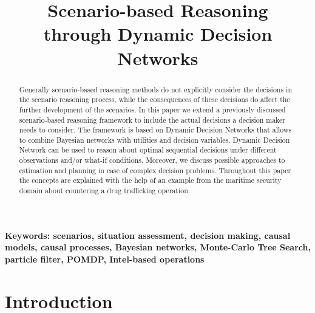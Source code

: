 \documentclass[conference]{IEEEtran}
\begin{document}
\title{Scenario-based Reasoning \\through Dynamic Decision Networks}

\author{
\and
{}
\and
{}
}


\maketitle

\begin{abstract}
Generally scenario-based reasoning methods do not explicitly consider the decisions in the scenario reasoning process, while the consequences of these decisions do affect the further development of the scenarios. In this paper we extend a previously discussed scenario-based reasoning framework to include the actual decisions a decision maker needs to consider. The framework is based on Dynamic Decision Networks that allows to combine Bayesian networks with utilities and decision variables. Dynamic Decision Network can be used to reason about optimal sequential decisions under different observations and/or what-if conditions. Moreover, we discuss possible approaches to estimation and planning in case of complex decision problems. Throughout this paper the concepts are explained with the help of an example from the maritime security domain about countering a drug trafficking operation.
\end{abstract}

\noindent
{\bf Keywords: scenarios, situation assessment, decision making, causal models, causal processes, Bayesian networks, Monte-Carlo Tree Search, particle filter, POMDP, Intel-based operations}


\IEEEpeerreviewmaketitle

\section{Introduction}
\end{document}
